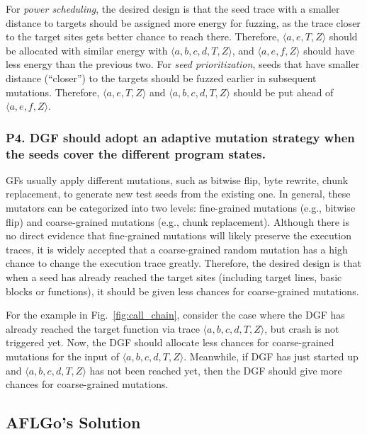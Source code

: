  For \emph{power scheduling}, the desired design is that the seed trace with a smaller distance to targets should be assigned more energy for fuzzing, as the trace closer to the target sites gets better chance to reach there. Therefore, $\langle a, e, T, Z\rangle$ should be allocated with similar energy with $\langle a, b, c, d, T, Z\rangle$, and $\langle a, e, f, Z\rangle$ should have less energy than the previous two. For \emph{seed prioritization}, seeds that have smaller distance (``closer'') to the targets should be fuzzed earlier in subsequent mutations. Therefore, $\langle a, e, T, Z\rangle$ and $\langle a, b, c, d, T, Z\rangle$ should be put ahead of $\langle a, e, f, Z\rangle$.

\subsubsection{\textbf{P4}. DGF should adopt an \textbf{adaptive} mutation strategy when the seeds cover the different program states.}  \label{subsec:p4}
 GFs usually apply different mutations, such as bitwise flip, byte rewrite, chunk replacement, to generate new test seeds from the existing one. 
In general, these mutators can be categorized into two levels: fine-grained mutations (e.g., bitwise flip) and coarse-grained mutations (e.g., chunk replacement).
 Although there is no direct evidence that fine-grained mutations will likely preserve the execution traces, it is widely accepted that a coarse-grained random mutation has a high chance to change the execution trace greatly. Therefore, the desired design is that when a seed has already reached the target sites (including target lines, basic blocks or functions), it should be given less chances for coarse-grained mutations.
 
For the example in Fig.~\ref{fig:call_chain}, consider the case where the DGF has already reached the target function via trace $\langle a, b, c, d, T, Z\rangle $, but crash is not triggered yet.
Now, the DGF should allocate less chances for coarse-grained mutations for the input of $\langle a, b, c, d, T, Z\rangle $.
Meanwhile, if DGF has just started up and $\langle a, b, c, d, T, Z\rangle $ has not been reached yet, then the DGF should give more chances for coarse-grained mutations.
%
 







\subsection{AFLGo's Solution} \label{subsec:aflgo_sol}


